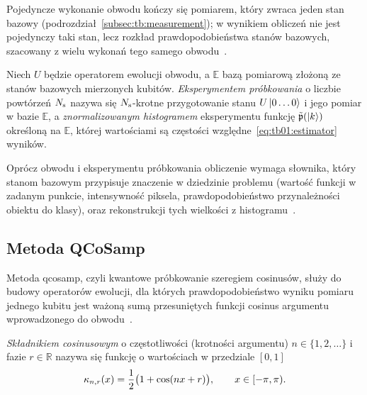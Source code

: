 Pojedyncze wykonanie obwodu kończy się pomiarem, który zwraca jeden stan bazowy (podrozdział~\ref{subsec:tb:measurement}); w  wynikiem obliczeń nie jest pojedynczy taki stan, lecz rozkład prawdopodobieństwa stanów bazowych, szacowany z wielu wykonań tego samego obwodu~\cite{wereszczynski_cosine_2020,werner_experiment_driven_2022}.

\begin{Definition}\label{def:tb:qsamp:sampling}
Niech $U$ będzie operatorem ewolucji obwodu, a $\mathbb{E}$ bazą pomiarową złożoną ze stanów bazowych mierzonych kubitów.
\emph{Eksperymentem próbkowania} o liczbie powtórzeń $N_{\mathrm{s}}$ nazywa się $N_{\mathrm{s}}$-krotne przygotowanie stanu $U\ket{0\dots0}$ i jego pomiar w bazie $\mathbb{E}$, a \emph{znormalizowanym histogramem} eksperymentu funkcję $\tilde{\mathfrak{p}}(\ket{k})$ określoną na $\mathbb{E}$, której wartościami są częstości względne~\eqref{eq:tb01:estimator} wyników.
\end{Definition}

Oprócz obwodu i eksperymentu próbkowania obliczenie wymaga słownika, który stanom bazowym przypisuje znaczenie w dziedzinie problemu (wartość funkcji w zadanym punkcie, intensywność piksela, prawdopodobieństwo przynależności obiektu do klasy), oraz rekonstrukcji tych wielkości z histogramu~\cite{wereszczynski_cosine_2020}.

\subsection{Metoda QCoSamp}\label{subsec:tb:qsamp:qcosamp}

Metoda \gls{qcosamp}, czyli kwantowe próbkowanie szeregiem cosinusów, służy do budowy operatorów ewolucji, dla których prawdopodobieństwo wyniku pomiaru jednego kubitu jest ważoną sumą przesuniętych funkcji cosinus argumentu wprowadzonego do obwodu~\cite{wereszczynski_cosine_2020}.

\begin{Definition}\label{def:tb:qsamp:component}
\emph{Składnikiem cosinusowym} o częstotliwości (krotności argumentu) $n\in\{1,2,\dots\}$ i fazie $r\in\mathbb{R}$ nazywa się funkcję o wartościach w przedziale $[0,1]$
\begin{equation}\label{eq:tb:qsamp:component}
\kappa_{n,r}(x)=\frac{1}{2}\bigl(1+\cos(nx+r)\bigr),\qquad x\in[-\pi,\pi).
\end{equation}
\end{Definition}

